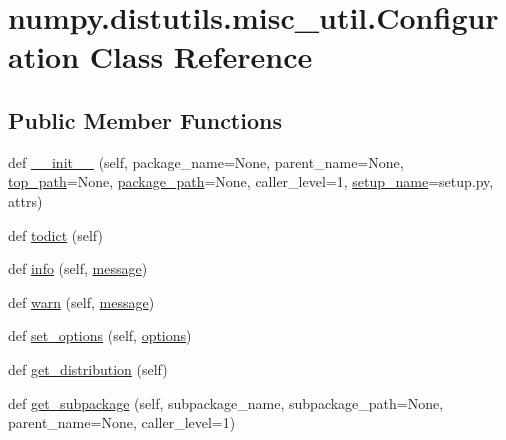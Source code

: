 \hypertarget{classnumpy_1_1distutils_1_1misc__util_1_1Configuration}{}\section{numpy.\+distutils.\+misc\+\_\+util.\+Configuration Class Reference}
\label{classnumpy_1_1distutils_1_1misc__util_1_1Configuration}
\subsection*{Public Member Functions}
\begin{DoxyCompactItemize}
\item 
def \hyperlink{classnumpy_1_1distutils_1_1misc__util_1_1Configuration_a6c4d256d49799aec23aa601e46efa1a0}{\+\_\+\+\_\+init\+\_\+\+\_\+} (self, package\+\_\+name=None, parent\+\_\+name=None, \hyperlink{classnumpy_1_1distutils_1_1misc__util_1_1Configuration_a02058551ba5f633857f97647a326db34}{top\+\_\+path}=None, \hyperlink{classnumpy_1_1distutils_1_1misc__util_1_1Configuration_a9b07575613365c1d66611d2d9c39c44f}{package\+\_\+path}=None, caller\+\_\+level=1, \hyperlink{classnumpy_1_1distutils_1_1misc__util_1_1Configuration_a9969f6728bba9110ddff25d7d4a53ff9}{setup\+\_\+name}=\textquotesingle{}setup.\+py\textquotesingle{}, attrs)
\item 
def \hyperlink{classnumpy_1_1distutils_1_1misc__util_1_1Configuration_ad4d28fab398852bb9be35fdea8d28435}{todict} (self)
\item 
def \hyperlink{classnumpy_1_1distutils_1_1misc__util_1_1Configuration_a34d7a120320999f56bd8b54736e86fa7}{info} (self, \hyperlink{namespacenumpy_a2222f7c2b3c819deee274f05ccc2a705}{message})
\item 
def \hyperlink{classnumpy_1_1distutils_1_1misc__util_1_1Configuration_a469af60cce2b915d174ad92011006fa1}{warn} (self, \hyperlink{namespacenumpy_a2222f7c2b3c819deee274f05ccc2a705}{message})
\item 
def \hyperlink{classnumpy_1_1distutils_1_1misc__util_1_1Configuration_a6e2522277c649460194c04311856ab37}{set\+\_\+options} (self, \hyperlink{classnumpy_1_1distutils_1_1misc__util_1_1Configuration_a92d0da999633c6c9c7517b6bd941826a}{options})
\item 
def \hyperlink{classnumpy_1_1distutils_1_1misc__util_1_1Configuration_ac4363b0bb08c118ada91763e0515d8c6}{get\+\_\+distribution} (self)
\item 
def \hyperlink{classnumpy_1_1distutils_1_1misc__util_1_1Configuration_a0bb22fff31ebd50cd5f4749bcbee417b}{get\+\_\+subpackage} (self, subpackage\+\_\+name, subpackage\+\_\+path=None, parent\+\_\+name=None, caller\+\_\+level=1)

\end{DoxyCompactItemize}
